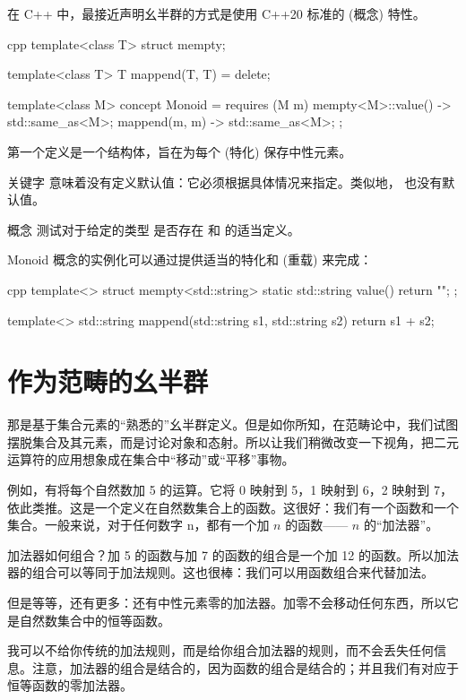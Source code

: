 在 C++ 中，最接近声明幺半群的方式是使用 C++20 标准的  (概念) 特性。

\begin{snip}{cpp}
template<class T>
struct mempty;

template<class T>
T mappend(T, T) = delete;

template<class M>
concept Monoid = requires (M m) {
    { mempty<M>::value() } -> std::same_as<M>;
    { mappend(m, m) } -> std::same_as<M>;
};
\end{snip}
第一个定义是一个结构体，旨在为每个  (特化) 保存中性元素。

关键字  意味着没有定义默认值：它必须根据具体情况来指定。类似地， 也没有默认值。

概念  测试对于给定的类型  是否存在  和  的适当定义。

Monoid 概念的实例化可以通过提供适当的特化和  (重载) 来完成：

\begin{snip}{cpp}
template<>
struct mempty<std::string> {
    static std::string value() { return ""; }
};

template<>
std::string mappend(std::string s1, std::string s2) {
    return s1 + s2;
}
\end{snip}

\section{作为范畴的幺半群}

那是基于集合元素的“熟悉的”幺半群定义。但是如你所知，在范畴论中，我们试图摆脱集合及其元素，而是讨论对象和态射。所以让我们稍微改变一下视角，把二元运算符的应用想象成在集合中“移动”或“平移”事物。

例如，有将每个自然数加 5 的运算。它将 0 映射到 5，1 映射到 6，2 映射到 7，依此类推。这是一个定义在自然数集合上的函数。这很好：我们有一个函数和一个集合。一般来说，对于任何数字 n，都有一个加 $n$ 的函数—— $n$ 的“加法器”。

加法器如何组合？加 5 的函数与加 7 的函数的组合是一个加 12 的函数。所以加法器的组合可以等同于加法规则。这也很棒：我们可以用函数组合来代替加法。

但是等等，还有更多：还有中性元素零的加法器。加零不会移动任何东西，所以它是自然数集合中的恒等函数。

我可以不给你传统的加法规则，而是给你组合加法器的规则，而不会丢失任何信息。注意，加法器的组合是结合的，因为函数的组合是结合的；并且我们有对应于恒等函数的零加法器。

